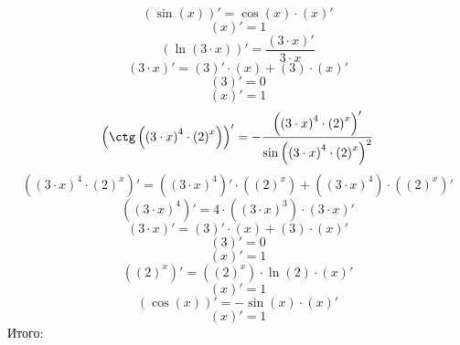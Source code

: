 \documentclass[a4paper,12pt]{article} %
\begin{document}
 \newline$$  \left(\sin\left(x\right) \right)' =  \cos \left( x \right)  \cdot  \left(x \right)' $$
 \newline$$  \left(x \right)' = 1 $$
 \newline$$  \left(\ln\left(3\cdot x\right) \right)' =  \frac{  \left(3\cdot x \right)' }{ 3\cdot x } $$
 \newline$$  \left(3\cdot x \right)' =  \left(3 \right)' \cdot  \left(x \right) +  \left(3 \right) \cdot  \left(x \right)' $$
 \newline$$  \left(3 \right)' = 0 $$
 \newline$$  \left(x \right)' = 1 $$
 \newline$$  \left(\ctg\left( \left( 3\cdot x \right) ^{4}\cdot  \left( 2 \right) ^{x}\right) \right)' =  - \frac{  \left( \left( 3\cdot x \right) ^{4}\cdot  \left( 2 \right) ^{x} \right)' }{  \sin \left(  \left( 3\cdot x \right) ^{4}\cdot  \left( 2 \right) ^{x} \right)^2 } $$
 \newline$$  \left( \left( 3\cdot x \right) ^{4}\cdot  \left( 2 \right) ^{x} \right)' =  \left( \left( 3\cdot x \right) ^{4} \right)' \cdot  \left( \left( 2 \right) ^{x} \right) +  \left( \left( 3\cdot x \right) ^{4} \right) \cdot  \left( \left( 2 \right) ^{x} \right)' $$
 \newline$$  \left( \left( 3\cdot x \right) ^{4} \right)' = 4 \cdot  \left( \left( 3\cdot x \right) ^{3} \right) \cdot  \left(3\cdot x \right)' $$
 \newline$$  \left(3\cdot x \right)' =  \left(3 \right)' \cdot  \left(x \right) +  \left(3 \right) \cdot  \left(x \right)' $$
 \newline$$  \left(3 \right)' = 0 $$
 \newline$$  \left(x \right)' = 1 $$
 \newline$$  \left( \left( 2 \right) ^{x} \right)' =  \left( \left( 2 \right) ^{x} \right) \cdot \ln \left( 2 \right) \cdot \left(x \right)' $$
 \newline$$  \left(x \right)' = 1 $$
 \newline$$  \left(\cos\left(x\right) \right)' =  - \sin \left( x \right)  \cdot  \left(x \right)' $$
 \newline$$  \left(x \right)' = 1 $$
 \newline Итого: 
\end{document}
